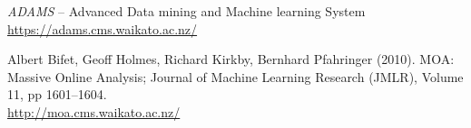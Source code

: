 %

\begin{thebibliography}{999}

		\textit{ADAMS} -- Advanced Data mining and Machine learning System \\
		\url{https://adams.cms.waikato.ac.nz/}{}

  		Albert Bifet, Geoff Holmes, Richard Kirkby, Bernhard Pfahringer (2010).
  		MOA: Massive Online Analysis; Journal of Machine Learning Research (JMLR),
  		Volume 11, pp 1601--1604. \\
		\url{http://moa.cms.waikato.ac.nz/}{}

\end{thebibliography}
